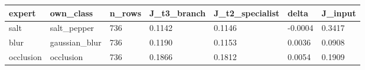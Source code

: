 \begin{tabular}{lllllll}
\hline
expert & own\_class & n\_rows & J\_t3\_branch & J\_t2\_specialist & delta & J\_input \\
\hline
salt & salt\_pepper & 736 & 0.1142 & 0.1146 & -0.0004 & 0.3417 \\
blur & gaussian\_blur & 736 & 0.1190 & 0.1153 & 0.0036 & 0.0908 \\
occlusion & occlusion & 736 & 0.1866 & 0.1812 & 0.0054 & 0.1909 \\
\hline
\end{tabular}
